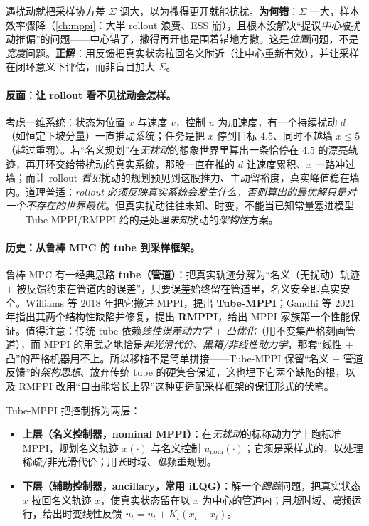 \begin{pitfall}
遇扰动就把采样协方差 $\Sigma$ 调大，以为撒得更开就能抗扰。\textbf{为何错}：$\Sigma$ 一大，样本效率骤降（\cref{ch:mppi}：大半 rollout 浪费、ESS 崩），且根本没解决“提议\emph{中心}被扰动推偏”的问题——中心错了，撒得再开也是围着错地方撒。这是\emph{位置}问题，不是\emph{宽度}问题。\textbf{正解}：用反馈把真实状态拉回名义附近（让中心重新有效），并让采样在闭环意义下评估，而非盲目加大 $\Sigma$。
\end{pitfall}

\paragraph{反面：让 rollout 看不见扰动会怎样。}
考虑一维系统：状态为位置 $x$ 与速度 $v$，控制 $u$ 为加速度，有一个持续扰动 $d$（如恒定下坡分量）一直推动系统；任务是把 $x$ 停到目标 $4.5$、同时不越墙 $x\le 5$（越过重罚）。若“名义规划”在\emph{无扰动}的想象世界里算出一条恰停在 $4.5$ 的漂亮轨迹，再开环交给带扰动的真实系统，那股一直在推的 $d$ 让速度累积、$x$ 一路冲过墙；而让 rollout \emph{看见}扰动的规划预见到这股推力、主动留裕度，真实峰值稳在墙内\cite{williams2018robust}。道理普适：\emph{rollout 必须反映真实系统会发生什么，否则算出的最优解只是对一个不存在的世界最优}。但真实扰动往往未知、时变，不能当已知常量塞进模型——Tube-MPPI/RMPPI 给的是处理\emph{未知}扰动的\emph{架构性}方案。

\paragraph{历史：从鲁棒 MPC 的 tube 到采样框架。}
鲁棒 MPC 有一经典思路 \textbf{tube（管道）}：把真实轨迹分解为“名义（无扰动）轨迹 $+$ 被反馈约束在管道内的误差”，只要误差始终留在管道里，名义安全即真实安全。Williams 等 $2018$ 年把它搬进 MPPI，提出 \textbf{Tube-MPPI}\cite{williams2018robust}；Gandhi 等 $2021$ 年指出其两个结构性缺陷并修复，提出 \textbf{RMPPI}，给出 MPPI 家族第一个性能保证\cite{gandhi2021robust}。值得注意：传统 tube 依赖\emph{线性误差动力学 $+$ 凸优化}（用不变集严格刻画管道），而 MPPI 的用武之地恰是\emph{非光滑代价、黑箱/非线性动力学}，那套“线性 $+$ 凸”的严格机器用不上。所以移植不是简单拼接——Tube-MPPI 保留“名义 $+$ 管道反馈”的\emph{架构思想}、放弃传统 tube 的硬集合保证，这也埋下它两个缺陷的根，以及 RMPPI 改用“自由能增长上界”这种更适配采样框架的保证形式的伏笔。

\begin{definition}\label{def:mv-tube}
Tube-MPPI 把控制拆为两层：
\begin{itemize}
  \item \textbf{上层（名义控制器，nominal MPPI）}：在\emph{无扰动}的标称动力学上跑标准 MPPI，规划名义轨迹 $\bar{x}(\cdot)$ 与名义控制 $u_{\text{nom}}(\cdot)$；它须是采样式的，以处理稀疏/非光滑代价；用\emph{长}时域、\emph{低}频重规划。
  \item \textbf{下层（辅助控制器，ancillary，常用 iLQG）}：解一个\emph{跟踪}问题，把真实状态 $x$ 拉回名义轨迹 $\bar{x}$，使真实状态留在以 $\bar{x}$ 为中心的管道内；用\emph{短}时域、\emph{高}频运行，给出时变线性反馈 $u_t=\bar u_t+K_t(x_t-\bar x_t)$。
\end{itemize}
\end{definition}

